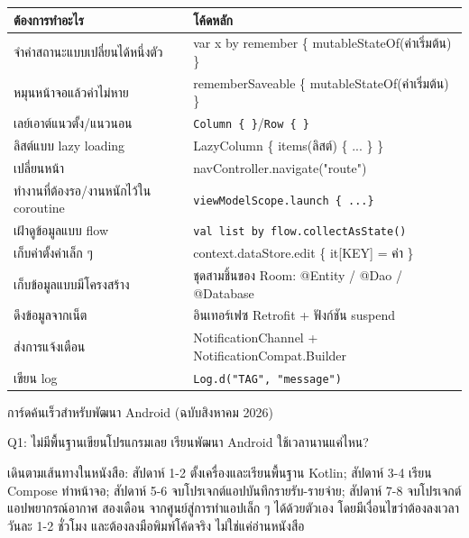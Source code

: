 


\begin{center}
\begin{tabularx}{\linewidth}{|X|X|}
\hline
\textbf{ต้องการทำอะไร} & \textbf{โค้ดหลัก} \tabularnewline
\hline
จำค่าสถานะแบบเปลี่ยนได้หนึ่งตัว & var x by remember \{ mutableStateOf(ค่าเริ่มต้น) \} \tabularnewline
หมุนหน้าจอแล้วค่าไม่หาย & rememberSaveable \{ mutableStateOf(ค่าเริ่มต้น) \} \tabularnewline
เลย์เอาต์แนวตั้ง/แนวนอน & \texttt{Column \{ \}}/\texttt{Row \{ \}} \tabularnewline
ลิสต์แบบ lazy loading & LazyColumn \{ items(ลิสต์) \{ ... \} \} \tabularnewline
เปลี่ยนหน้า & navController.navigate("route") \tabularnewline
ทำงานที่ต้องรอ/งานหนักไว้ใน coroutine & \texttt{viewModelScope.\allowbreak launch \{ .\allowbreak .\allowbreak .\allowbreak  \}} \tabularnewline
เฝ้าดูข้อมูลแบบ flow & \texttt{val list by flow.\allowbreak collectAsState()} \tabularnewline
เก็บค่าตั้งค่าเล็ก ๆ & context.dataStore.edit \{ it[KEY] = ค่า \} \tabularnewline
เก็บข้อมูลแบบมีโครงสร้าง & ชุดสามชิ้นของ Room: @Entity / @Dao / @Database \tabularnewline
ดึงข้อมูลจากเน็ต & อินเทอร์เฟซ Retrofit + ฟังก์ชัน suspend \tabularnewline
ส่งการแจ้งเตือน & NotificationChannel + NotificationCompat.Builder \tabularnewline
เขียน log & \texttt{Log.\allowbreak d("TAG", "message")} \tabularnewline
\hline
\end{tabularx}
\end{center}

\begin{center}\small\color{gray}การ์ดค้นเร็วสำหรับพัฒนา Android (ฉบับสิงหาคม 2026)\end{center}


Q1: ไม่มีพื้นฐานเขียนโปรแกรมเลย เรียนพัฒนา Android ใช้เวลานานแค่ไหน?

เดินตามเส้นทางในหนังสือ: สัปดาห์ 1-2 ตั้งเครื่องและเรียนพื้นฐาน Kotlin; สัปดาห์ 3-4 เรียน Compose ทำหน้าจอ; สัปดาห์ 5-6 จบโปรเจกต์แอปบันทึกรายรับ-รายจ่าย; สัปดาห์ 7-8 จบโปรเจกต์แอปพยากรณ์อากาศ สองเดือน จากศูนย์สู่การทำแอปเล็ก ๆ ได้ด้วยตัวเอง โดยมีเงื่อนไขว่าต้องลงเวลาวันละ 1-2 ชั่วโมง และต้องลงมือพิมพ์โค้ดจริง ไม่ใช่แค่อ่านหนังสือ

